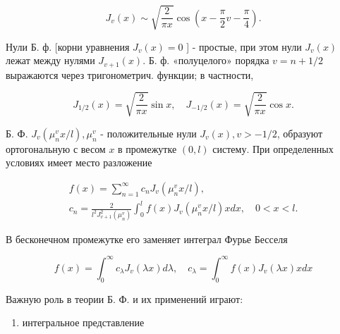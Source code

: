 \documentclass[10pt]{article}
\begin{document}
\[

J_{v}(x) \sim \sqrt{\frac{2}{\pi x}} \cos \left(x-\frac{\pi}{2} v-\frac{\pi}{4}\right) .

\]



Нули Б. ф. [корни уравнения $J_{v}(x)=0$ ] - простые, при этом нули $J_{v}(x)$ лежат между нулями $J_{v+1}(x)$. Б. ф. «полуцелого» порядка $v=n+1 / 2$ выражаются через тригонометрич. функции; в частности,



\[

J_{1 / 2}(x)=\sqrt{\frac{2}{\pi x}} \sin x, \quad J_{-1 / 2}(x)=\sqrt{\frac{2}{\pi x}} \cos x .

\]



Б. Ф. $J_{v}\left(\mu_{n}^{v} x / l\right), \mu_{n}^{v}$ - положительные нули $J_{v}(x), v>-1 / 2$, образуют ортогональную с весом $x$ в промежутке $(0, l)$ систему. При определенных условиях имеет место разложение



\[

\begin{gathered}

f(x)=\sum_{n=1}^{\infty} c_{n} J_{v}\left(\mu_{n}^{v} x / l\right), \\

c_{n}=\frac{2}{l^{2} J_{v+1}^{2}\left(\mu_{n}^{v}\right)} \int_{0}^{l} f(x) J_{v}\left(\mu_{n}^{v} x / l\right) x d x, \quad 0<x<l .

\end{gathered}

\]



В бесконечном промежутке его заменяет интеграл Фурье Бесселя



\[

f(x)=\int_{0}^{\infty} c_{\lambda} J_{v}(\lambda x) d \lambda, \quad c_{\lambda}=\int_{0}^{\infty} f(x) J_{v}(\lambda x) x d x

\]



Важную роль в теории Б. Ф. и их применений играют:



\begin{enumerate}

  \item интегральное представление

\end{enumerate}
\end{document}
